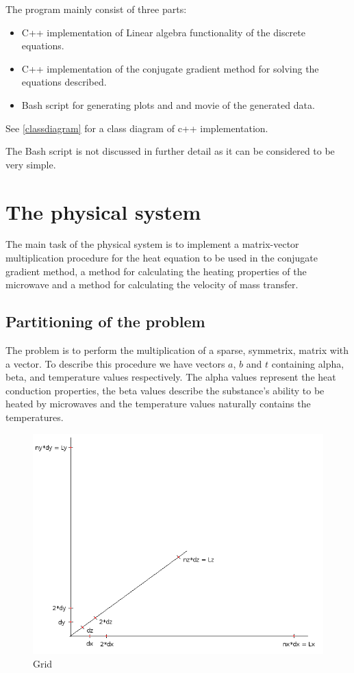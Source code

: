 The program mainly consist of three parts:

\begin{itemize}
\item C++ implementation of Linear algebra functionality of the discrete equations.
\item C++ implementation of the conjugate gradient method for solving the
equations described.
\item Bash script for generating plots and and movie of the generated data.
\end{itemize}

See \cref{classdiagram} for a class diagram of c++ implementation.

The Bash script is not discussed in further detail as it can be considered to be
very simple.

\section{The physical system}

The main task of the physical system is to implement a matrix-vector multiplication
procedure for the heat equation to be used in the conjugate gradient method, 
a method for calculating the heating properties of the microwave and a method 
for calculating the velocity of mass transfer.

\subsection{Partitioning of the problem}

The problem is to perform the multiplication of a sparse, symmetrix, matrix with a
vector. To describe this procedure we have vectors $a$, $b$ and $t$ containing alpha,
beta, and temperature values respectively. The alpha values represent the heat 
conduction properties, the beta values describe the substance's ability to be heated
by microwaves and the temperature values naturally contains the temperatures.

\begin{figure}[!h]
  \begin{center}
    \includegraphics[width=0.5\linewidth]{grid.png}
  \end{center}
  \caption{Grid}
  \label{fig:grid}
\end{figure}

